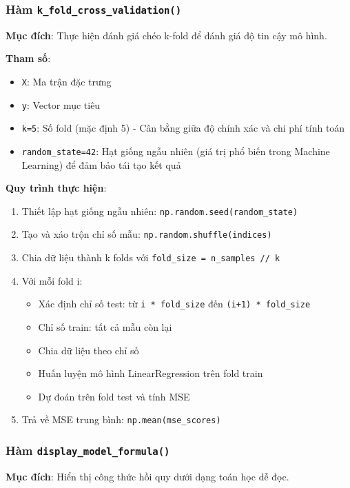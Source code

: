 \subsubsection{Hàm \texttt{k\_fold\_cross\_validation()}}
\textbf{Mục đích}: Thực hiện đánh giá chéo k-fold để đánh giá độ tin cậy mô hình.

\textbf{Tham số}:
\begin{itemize}
	\item \texttt{X}: Ma trận đặc trưng
	\item \texttt{y}: Vector mục tiêu
	\item \texttt{k=5}: Số fold (mặc định 5) - Cân bằng giữa độ chính xác và chi phí tính toán
	\item \texttt{random\_state=42}: Hạt giống ngẫu nhiên (giá trị phổ biến trong Machine Learning) để đảm bảo tái tạo kết quả
\end{itemize}

\textbf{Quy trình thực hiện}:
\begin{enumerate}
	\item Thiết lập hạt giống ngẫu nhiên: \texttt{np.random.seed(random\_state)}
	\item Tạo và xáo trộn chỉ số mẫu: \texttt{np.random.shuffle(indices)}
	\item Chia dữ liệu thành k folds với \texttt{fold\_size = n\_samples // k}
	\item Với mỗi fold i:
	      \begin{itemize}
		      \item Xác định chỉ số test: từ \texttt{i * fold\_size} đến \texttt{(i+1) * fold\_size}
		      \item Chỉ số train: tất cả mẫu còn lại
		      \item Chia dữ liệu theo chỉ số
		      \item Huấn luyện mô hình LinearRegression trên fold train
		      \item Dự đoán trên fold test và tính MSE
	      \end{itemize}
	\item Trả về MSE trung bình: \texttt{np.mean(mse\_scores)}
\end{enumerate}

\subsubsection{Hàm \texttt{display\_model\_formula()}}
\textbf{Mục đích}: Hiển thị công thức hồi quy dưới dạng toán học dễ đọc.

